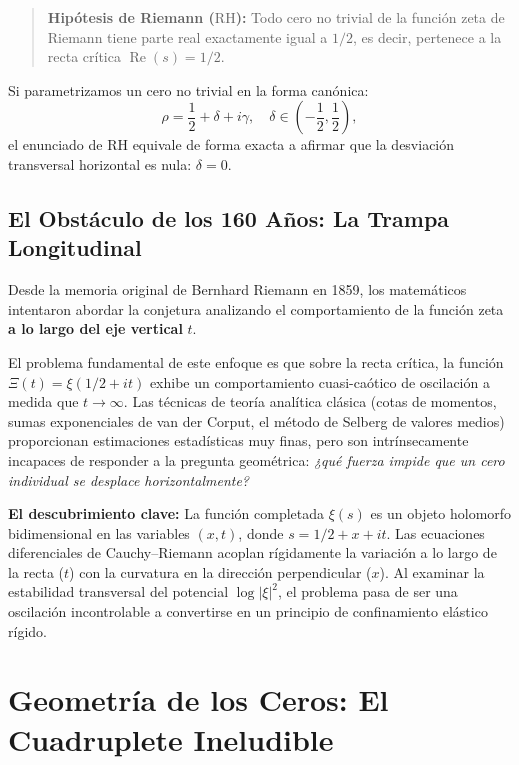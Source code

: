\documentclass[11pt,a4paper]{article}
\theoremstyle{definition}
\theoremstyle{remark}
\begin{document}
\begin{quote}
\textbf{Hipótesis de Riemann ($\mathrm{RH}$):} Todo cero no trivial de la función zeta de Riemann tiene parte real exactamente igual a $1/2$, es decir, pertenece a la recta crítica $\operatorname{Re}(s) = 1/2$.
\end{quote}

Si parametrizamos un cero no trivial en la forma canónica:
\begin{equation}
\rho = \frac{1}{2} + \delta + i\gamma, \quad \delta \in \left(-\frac{1}{2}, \frac{1}{2}\right),
\end{equation}
el enunciado de $\mathrm{RH}$ equivale de forma exacta a afirmar que la desviación transversal horizontal es nula: $\delta = 0$.

\subsection{El Obstáculo de los 160 Años: La Trampa Longitudinal}
Desde la memoria original de Bernhard Riemann en 1859, los matemáticos intentaron abordar la conjetura analizando el comportamiento de la función zeta \textbf{a lo largo del eje vertical} $t$. 

El problema fundamental de este enfoque es que sobre la recta crítica, la función $\Xi(t) = \xi(1/2 + it)$ exhibe un comportamiento cuasi-caótico de oscilación a medida que $t \to \infty$. Las técnicas de teoría analítica clásica (cotas de momentos, sumas exponenciales de van der Corput, el método de Selberg de valores medios) proporcionan estimaciones estadísticas muy finas, pero son intrínsecamente incapaces de responder a la pregunta geométrica: \emph{¿qué fuerza impide que un cero individual se desplace horizontalmente?}

\textbf{El descubrimiento clave:} La función completada $\xi(s)$ es un objeto holomorfo bidimensional en las variables $(x, t)$, donde $s = 1/2 + x + it$. Las ecuaciones diferenciales de Cauchy--Riemann acoplan rígidamente la variación a lo largo de la recta ($t$) con la curvatura en la dirección perpendicular ($x$). Al examinar la estabilidad transversal del potencial $\log |\xi|^2$, el problema pasa de ser una oscilación incontrolable a convertirse en un principio de confinamiento elástico rígido.

\section{Geometría de los Ceros: El Cuadruplete Ineludible}
\end{document}
